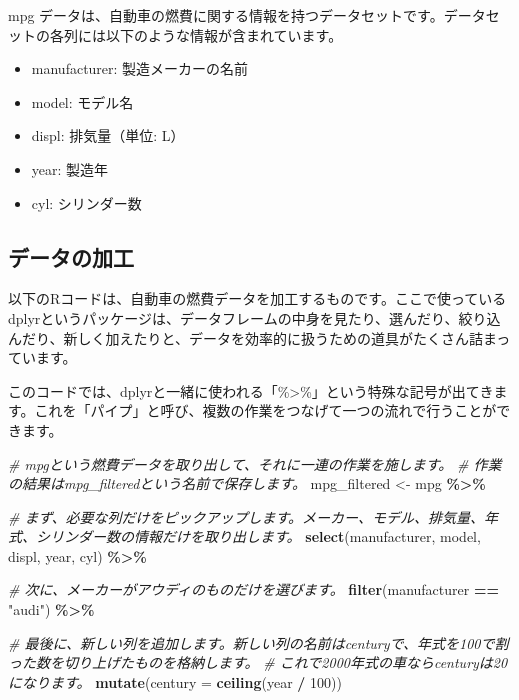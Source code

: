 \documentclass[
]{article}
\newenvironment{Shaded}{\begin{snugshade}}{\end{snugshade}}
\newcommand{\AttributeTok}[1]{\textcolor[rgb]{0.13,0.29,0.53}{#1}}
\newcommand{\CommentTok}[1]{\textcolor[rgb]{0.56,0.35,0.01}{\textit{#1}}}
\newcommand{\DecValTok}[1]{\textcolor[rgb]{0.00,0.00,0.81}{#1}}
\newcommand{\FunctionTok}[1]{\textcolor[rgb]{0.13,0.29,0.53}{\textbf{#1}}}
\newcommand{\NormalTok}[1]{#1}
\newcommand{\OtherTok}[1]{\textcolor[rgb]{0.56,0.35,0.01}{#1}}
\newcommand{\SpecialCharTok}[1]{\textcolor[rgb]{0.81,0.36,0.00}{\textbf{#1}}}
\newcommand{\StringTok}[1]{\textcolor[rgb]{0.31,0.60,0.02}{#1}}
\providecommand{\tightlist}{%
  \setlength{\itemsep}{0pt}\setlength{\parskip}{0pt}}
\begin{document}
mpg
データは、自動車の燃費に関する情報を持つデータセットです。データセットの各列には以下のような情報が含まれています。

\begin{itemize}
\tightlist
\item
  manufacturer: 製造メーカーの名前
\item
  model: モデル名
\item
  displ: 排気量（単位: L）
\item
  year: 製造年
\item
  cyl: シリンダー数
\end{itemize}

\hypertarget{ux30c7ux30fcux30bfux306eux52a0ux5de5}{%
\subsection{データの加工}\label{ux30c7ux30fcux30bfux306eux52a0ux5de5}}

以下のRコードは、自動車の燃費データを加工するものです。ここで使っているdplyrというパッケージは、データフレームの中身を見たり、選んだり、絞り込んだり、新しく加えたりと、データを効率的に扱うための道具がたくさん詰まっています。

このコードでは、dplyrと一緒に使われる「\%\textgreater\%」という特殊な記号が出てきます。これを「パイプ」と呼び、複数の作業をつなげて一つの流れで行うことができます。

\begin{Shaded}
\begin{Highlighting}[]
\CommentTok{\# mpgという燃費データを取り出して、それに一連の作業を施します。}
\CommentTok{\# 作業の結果はmpg\_filteredという名前で保存します。}
\NormalTok{mpg\_filtered }\OtherTok{\textless{}{-}}\NormalTok{ mpg }\SpecialCharTok{\%\textgreater{}\%}  

  \CommentTok{\# まず、必要な列だけをピックアップします。メーカー、モデル、排気量、年式、シリンダー数の情報だけを取り出します。}
  \FunctionTok{select}\NormalTok{(manufacturer, model, displ, year, cyl) }\SpecialCharTok{\%\textgreater{}\%}  

  \CommentTok{\# 次に、メーカーがアウディのものだけを選びます。}
  \FunctionTok{filter}\NormalTok{(manufacturer }\SpecialCharTok{==} \StringTok{"audi"}\NormalTok{) }\SpecialCharTok{\%\textgreater{}\%}  

  \CommentTok{\# 最後に、新しい列を追加します。新しい列の名前はcenturyで、年式を100で割った数を切り上げたものを格納します。}
  \CommentTok{\# これで2000年式の車ならcenturyは20になります。}
  \FunctionTok{mutate}\NormalTok{(}\AttributeTok{century =} \FunctionTok{ceiling}\NormalTok{(year }\SpecialCharTok{/} \DecValTok{100}\NormalTok{)) }
\end{Highlighting}
\end{Shaded}
\end{document}
